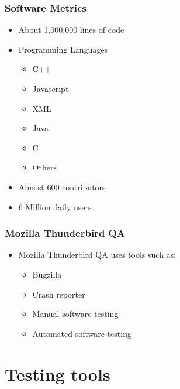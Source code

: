 \documentclass{beamer}
\begin{document}

\begin{frame}
\frametitle{Software Metrics}
 \begin{itemize}
 \item About 1.000.000 lines of code
 \item Programming Languages
    \begin{itemize}
     \item C++
     \item Javascript
     \item XML
     \item Java
     \item C
     \item Others
    \end{itemize}
 \item Almost 600 contributors
 \item 6 Million daily users
 \end{itemize}
\end{frame}


\begin{frame}
 \frametitle{Mozilla Thunderbird QA}
 \begin{itemize}
 \item Mozilla Thunderbird QA uses tools such as:
    \begin{itemize}
     \item Bugzilla
     \item Crash reporter
     \item Manual software testing
     \item Automated software testing 
    \end{itemize}
 \end{itemize}
\end{frame}

\section{Testing tools}
\end{document}
